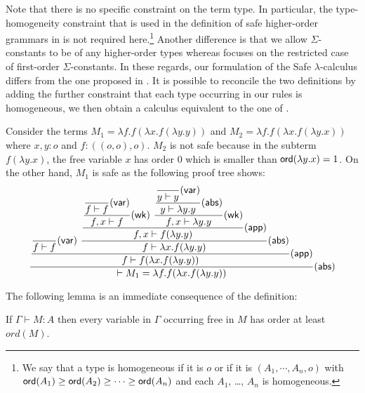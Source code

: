 \documentclass{llncs}
\newcommand\dps{\displaystyle}
\newcommand\rulef[2]{\frac{\dps #1}{#2}}
\newcommand\ord[1]{{\sf ord}(#1)}
\begin{document}
Note that there is no specific constraint on the term type. In particular, the type-homogeneity constraint that is used
in the definition of safe higher-order grammars in \cite{KNU02} is not required here.\footnote{ We say that a type is homogeneous
if it is $o$ or if it is $(A_1, \cdots, A_n, o)$ with $\ord{A_1} \geq \ord{A_2}\geq \cdots \geq \ord{A_n}$ and
each $A_1$, \ldots, $A_n$ is homogeneous.} Another difference is that we allow $\Sigma$-constants to be of any higher-order types whereas
\cite{KNU02} focuses on the restricted case of first-order $\Sigma$-constants.
In these regards, our formulation of the Safe $\lambda$-calculus differs from the one proposed in \cite{safety-mirlong2004}.
It is possible to reconcile the two definitions by adding the further constraint that each type occurring in our rules is homogeneous, we then obtain a calculus equivalent to the one of \cite{safety-mirlong2004}.




\begin{example}
Consider the terms $M_1 = \lambda f . f (\lambda x . f (\lambda y . y ))$ and
$M_2 = \lambda f . f (\lambda x . f (\lambda y .x ))$ where $x,y:o$ and $f:((o,o),o)$.
$M_2$ is not safe because in the subterm $f (\lambda y . x)$, the free variable $x$ has order $0$ which is smaller than $\ord{\lambda y . x} = 1$.
On the other hand, $M_1$ is safe as the following proof tree shows:
$$
 \rulef{
     \rulef{
        \rulef{}{f \vdash f} {\sf(var)}
        \
        \rulef{
             \rulef{
                \rulef{
                    \rulef{}{f \vdash f} {\sf(var)}
                }
                {f , x \vdash f } {\sf(wk)}
                \
                \rulef{
                    \rulef{
                        \rulef{}{y \vdash y} {\sf(var)}
                    }
                    {y \vdash \lambda y . y } {\sf(abs)}
                }
                {f , x \vdash \lambda y .y } {\sf(wk)}
             }
             {f , x \vdash f (\lambda y .y )} {\sf(app)}
        }
        { f  \vdash \lambda x . f (\lambda y .y )} {\sf(abs)}
     }
     {
        f  \vdash f (\lambda x . f (\lambda y .y ))} {\sf(app)}
     }
 { \vdash M_1 = \lambda f . f (\lambda x . f (\lambda y .y )) } {\sf(abs)}
$$
\end{example}

The following lemma is an immediate consequence of the definition:
\begin{lemma}
\label{lem:ordfreevar}
If $\Gamma \vdash M : A$ then every variable in $\Gamma$ occurring free in $M$ has order at least $ord(M)$.
\end{lemma}
\end{document}

